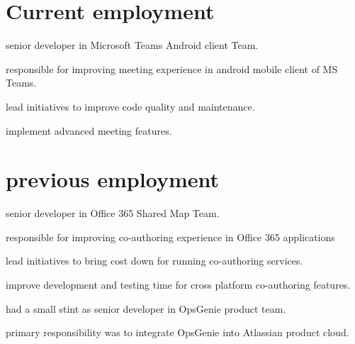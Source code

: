 \begin{minipage}[t]{0.66\textwidth} %


\section{Current employment}

\vspace{\topsep} %
\begin{tightitemize}
\item senior developer in Microsoft Teams Android client Team.
\item responsible for improving meeting experience in android mobile client of MS Teams.
\item lead initiatives to improve code quality and maintenance.
\item implement advanced meeting features.
\end{tightitemize}

\sectionspace %


\section{previous employment}

\begin{tightitemize}
\item senior developer in Office 365 Shared Map Team.
\item responsible for improving co-authoring experience in Office 365 applications
\item lead initiatives to bring cost down for running co-authoring services.
\item improve development and testing time for cross platform co-authoring features.
\end{tightitemize}

\sectionspace %


\begin{tightitemize}
\item had a small stint as senior developer in OpsGenie product team.
\item primary responsibility was to integrate OpsGenie into Atlassian product cloud.
\end{tightitemize}


\end{minipage}

